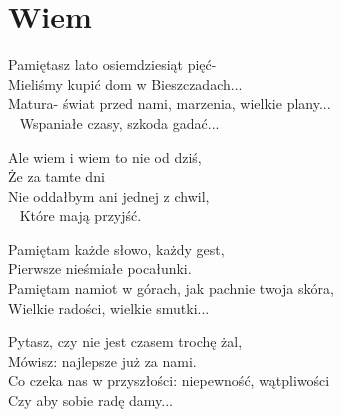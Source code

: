 \section{Wiem}
\begin{text}
Pamiętasz lato osiemdziesiąt pięć- \\
Mieliśmy kupić dom w Bieszczadach... \\
Matura- świat przed nami, marzenia, wielkie plany...\\ 
Wspaniałe czasy, szkoda gadać...

\vin Ale wiem i wiem to nie od dziś,\\
\vin Że za tamte dni\\
\vin Nie oddałbym ani jednej z chwil,\\ 
\vin Które mają przyjść.

Pamiętam każde słowo, każdy gest,\\
Pierwsze nieśmiałe pocałunki.\\
Pamiętam namiot w górach, jak pachnie twoja skóra,\\
Wielkie radości, wielkie smutki...

Pytasz, czy nie jest czasem trochę żal,\\
Mówisz: najlepsze już za nami.\\
Co czeka nas w przyszłości: niepewność, wątpliwości\\
Czy aby sobie radę damy...
\end{text}